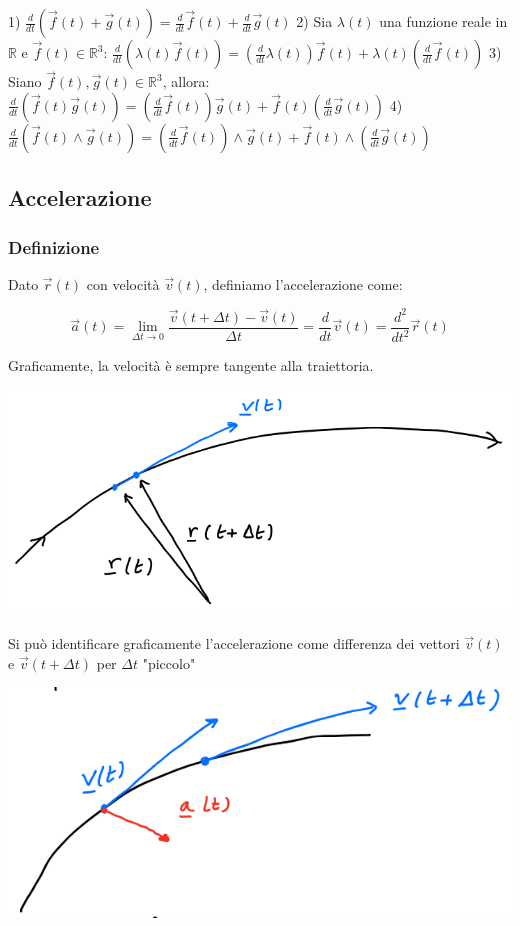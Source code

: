 \documentclass{subfiles}
\begin{document}
1) $\frac{d}{dt}(\vec{f}(t) + \vec{g}(t)) = \frac{d}{dt}\vec{f}(t) + \frac{d}{dt}\vec{g}(t)$
2) Sia $\lambda(t)$ una funzione reale in $\mathbb{R}$ e $\vec{f}(t) \in \mathbb{R}^3$: $\frac{d}{dt}(\lambda(t)\vec{f}(t)) = (\frac{d}{dt}\lambda(t))\vec{f}(t) + \lambda(t)(\frac{d}{dt}\vec{f}(t))$
3) Siano $\vec{f}(t), \vec{g}(t) \in \mathbb{R}^3$, allora: $\frac{d}{dt}(\vec{f}(t)\vec{g}(t)) = (\frac{d}{dt}\vec{f}(t))\vec{g}(t) + \vec{f}(t)(\frac{d}{dt}\vec{g}(t))$
4) $\frac{d}{dt}(\vec{f}(t) \wedge \vec{g}(t)) = (\frac{d}{dt}\vec{f}(t)) \wedge \vec{g}(t) + \vec{f}(t) \wedge (\frac{d}{dt}\vec{g}(t))$

\subsection{Accelerazione}

\subsubsection{Definizione}

Dato $\vec{r}(t)$ con velocità $\vec{v}(t)$, definiamo l'accelerazione come:

$$
\vec{a}(t) = \lim_{\Delta t \to 0} \frac{\vec{v}(t + \Delta t) - \vec{v}(t)}{\Delta t} = \frac{d}{dt} \vec{v}(t) = \frac{d^2}{dt^2} \vec{r}(t)
$$

\noindent
Graficamente, la velocità è sempre tangente alla traiettoria.

\includegraphics[width=\columnwidth]{rappresentazione-accelerazione-grafica}

\noindent
Si può identificare graficamente l'accelerazione come differenza dei vettori $\vec{v}(t)$ e $\vec{v}(t + \Delta t)$ per $\Delta t$ "piccolo"

\includegraphics[width=\columnwidth]{rappresentazione-accelerazione-grafica-differenza}
\end{document}
